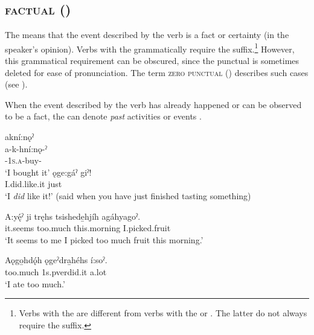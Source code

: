 \subsection{ \textsc{factual} ({\factual})} \label{[aˀ-] factual prefix}
The  {\factual} means that the event described by the verb is a fact or certainty (in the speaker’s opinion). Verbs with the  {\factual} grammatically require the  {\punctual} suffix.\footnote{Verbs with the {\factual} are different from verbs with the  {\indefinite} or  {\future}. The latter do not always require the  {\punctual} suffix.} However, this grammatical requirement can be obscured, since the  punctual is sometimes deleted for ease of pronunciation. The term \textsc{zero punctual} ({\zeropunctual}) describes such cases (see ).

When the event described by the verb has already happened or can be observed to be a fact, the  {\factual} can denote \textit{past} activities or events .

\ea\label{ex:moodex14} 

\ea akní:nǫˀ\\
\gll a-k-hní:nǫ-ˀ\\
{\factual}-\textsc{1s.a}-buy-{\punctual}\\
\glt `I bought it'
\ex
\gll ǫge:gáˀ giˀ!\\
I.did.like.it just\\ 
\glt ‘I \emph{did} like it!’ (said when you have just finished tasting something)
\clearpage

\ex
\gll A:yę́ˀ {ji tręh}s tsishede̱hjíh agáhyagoˀ. \\
it.seems too.much this.morning I.picked.fruit \\
\glt ‘It seems to me I picked too much fruit this morning.’

\ex
\gll Aǫgo̱hdǫ́h ǫgeˀdra̱héhs í:soˀ. \\
too.much 1s.pverdid.it a.lot \\
\glt ‘I ate too much.’ 


